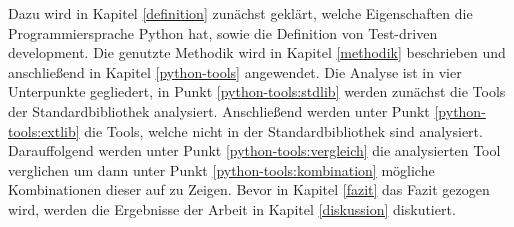 Dazu wird in Kapitel \ref{definition} zunächst geklärt, welche Eigenschaften
die Programmiersprache Python hat, sowie die Definition von Test-driven
development. Die genutzte Methodik wird in Kapitel \ref{methodik} beschrieben
und anschließend in Kapitel \ref{python-tools} angewendet. Die Analyse ist in
vier Unterpunkte gegliedert, in Punkt \ref{python-tools:stdlib} werden zunächst
die Tools der Standardbibliothek analysiert. Anschließend werden unter Punkt
\ref{python-tools:extlib} die Tools, welche nicht in der Standardbibliothek
sind analysiert. Darauffolgend werden unter Punkt \ref{python-tools:vergleich}
die analysierten Tool verglichen um dann unter Punkt
\ref{python-tools:kombination} mögliche Kombinationen dieser auf zu Zeigen.
Bevor in Kapitel \ref{fazit} das Fazit gezogen wird, werden die Ergebnisse der
Arbeit in Kapitel \ref{diskussion} diskutiert.